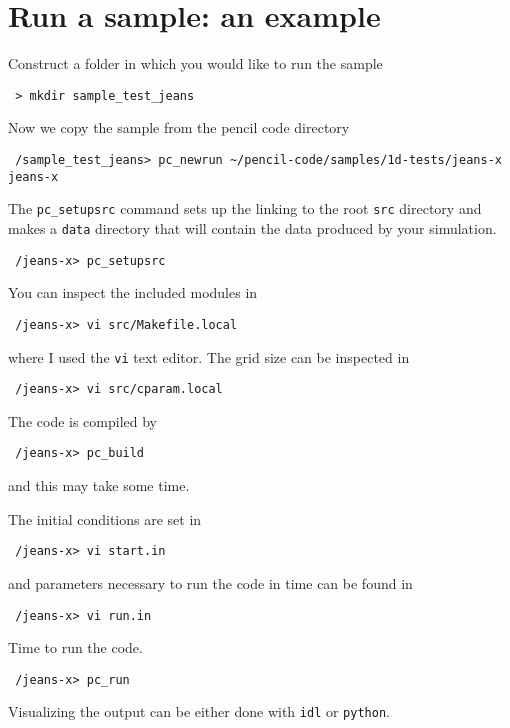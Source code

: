 \documentclass[a4paper,12pt]{article}
\begin{document}
\section{Run a sample: an example}

Construct a folder in which you would like to run the sample
\begin{verbatim}
 > mkdir sample_test_jeans
\end{verbatim}

Now we copy the sample from the pencil code directory
\begin{verbatim}
 /sample_test_jeans> pc_newrun ~/pencil-code/samples/1d-tests/jeans-x jeans-x
\end{verbatim}

The \verb|pc_setupsrc| command sets up the linking to the root \verb|src|
directory and makes a \verb|data| directory that will contain the data produced
by your simulation.
\begin{verbatim}
 /jeans-x> pc_setupsrc
\end{verbatim}

You can inspect the included modules in
\begin{verbatim}
 /jeans-x> vi src/Makefile.local 
\end{verbatim}
where I used the \verb|vi| text editor. The grid size can be inspected in 
\begin{verbatim}
 /jeans-x> vi src/cparam.local 
\end{verbatim}

The code is compiled by
\begin{verbatim}
 /jeans-x> pc_build
\end{verbatim}
and this may take some time.

The initial conditions are set in
\begin{verbatim}
 /jeans-x> vi start.in
\end{verbatim}

and parameters necessary to run the code in time can be found in
\begin{verbatim}
 /jeans-x> vi run.in
\end{verbatim}

Time to run the code. 
\begin{verbatim}
 /jeans-x> pc_run
\end{verbatim}

Visualizing the output can be either done with \verb|idl| or \verb|python|.
\end{document}
